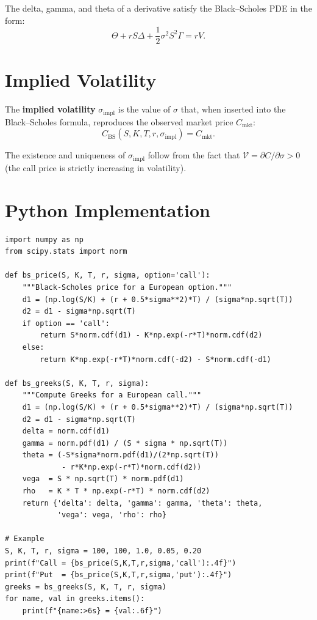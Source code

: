 \begin{proposition}
The delta, gamma, and theta of a derivative satisfy the Black--Scholes PDE
in the form:
\[
    \Theta + rS\Delta + \frac{1}{2}\sigma^2 S^2 \Gamma = rV.
\]
\end{proposition}

\section{Implied Volatility}

\begin{definition}
The \textbf{implied volatility} $\sigma_{\text{impl}}$ is the value of
$\sigma$ that, when inserted into the Black--Scholes formula, reproduces
the observed market price $C_{\text{mkt}}$:
\[
    C_{\text{BS}}(S, K, T, r, \sigma_{\text{impl}}) = C_{\text{mkt}}.
\]
\end{definition}

\begin{remark}
The existence and uniqueness of $\sigma_{\text{impl}}$ follow from the fact
that $\mathcal{V} = \partial C/\partial\sigma > 0$ (the call price is
strictly increasing in volatility).
\end{remark}

\section{Python Implementation}

\begin{codeblock}[title=\textbf{Black--Scholes Formulae and Greeks}]
\begin{verbatim}
import numpy as np
from scipy.stats import norm

def bs_price(S, K, T, r, sigma, option='call'):
    """Black-Scholes price for a European option."""
    d1 = (np.log(S/K) + (r + 0.5*sigma**2)*T) / (sigma*np.sqrt(T))
    d2 = d1 - sigma*np.sqrt(T)
    if option == 'call':
        return S*norm.cdf(d1) - K*np.exp(-r*T)*norm.cdf(d2)
    else:
        return K*np.exp(-r*T)*norm.cdf(-d2) - S*norm.cdf(-d1)

def bs_greeks(S, K, T, r, sigma):
    """Compute Greeks for a European call."""
    d1 = (np.log(S/K) + (r + 0.5*sigma**2)*T) / (sigma*np.sqrt(T))
    d2 = d1 - sigma*np.sqrt(T)
    delta = norm.cdf(d1)
    gamma = norm.pdf(d1) / (S * sigma * np.sqrt(T))
    theta = (-S*sigma*norm.pdf(d1)/(2*np.sqrt(T))
             - r*K*np.exp(-r*T)*norm.cdf(d2))
    vega  = S * np.sqrt(T) * norm.pdf(d1)
    rho   = K * T * np.exp(-r*T) * norm.cdf(d2)
    return {'delta': delta, 'gamma': gamma, 'theta': theta,
            'vega': vega, 'rho': rho}

# Example
S, K, T, r, sigma = 100, 100, 1.0, 0.05, 0.20
print(f"Call = {bs_price(S,K,T,r,sigma,'call'):.4f}")
print(f"Put  = {bs_price(S,K,T,r,sigma,'put'):.4f}")
greeks = bs_greeks(S, K, T, r, sigma)
for name, val in greeks.items():
    print(f"{name:>6s} = {val:.6f}")
\end{verbatim}
\end{codeblock}

